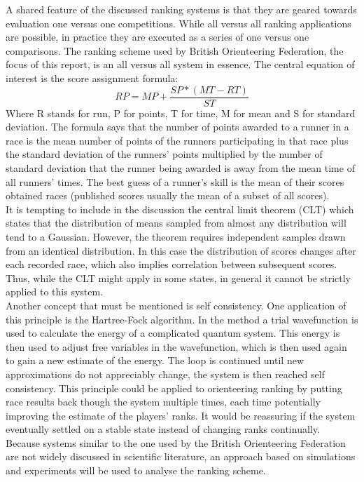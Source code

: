 A shared feature of the discussed ranking systems is that they are geared towards evaluation one versus one competitions. While all versus all ranking applications are possible, in practice they are executed as a series of one versus one comparisons. The ranking scheme used by British Orienteering Federation, the focus of this report, is an all versus all system in essence. The central equation of interest is the score assignment formula\cite{bof}:
\begin{equation}
RP = MP + \frac{SP * (MT - RT)}{ST}
\end{equation}
Where R stands for run, P for points, T for time, M for mean and S for standard deviation. The formula says that the number of points awarded to a runner in a race is the mean number of points of the runners participating in that race plus the standard deviation of the runners' points multiplied by the number of standard deviation that the runner being awarded is away from the mean time of all runners' times. The best guess of a runner's skill is the mean of their scores obtained races (published scores usually the mean of a subset of all scores).\\
It is tempting to include in the discussion the central limit theorem (CLT) which states that the distribution of means sampled from almost any distribution will tend to a Gaussian\cite{probability}. However, the theorem requires independent samples drawn from an identical distribution. In this case the distribution of scores changes after each recorded race, which also implies correlation between subsequent scores. Thus, while the CLT might apply in some states, in general it cannot be strictly applied to this system.\\
Another concept that must be mentioned is self consistency. One application of this principle is the Hartree-Fock algorithm. In the method a trial wavefunction is used to calculate the energy of a complicated quantum system. This energy is then used to adjust free variables in the wavefunction, which is then used again to gain a new estimate of the energy. The loop is continued until new approximations do not appreciably change, the system is then reached self consistency. This principle could be applied to orienteering ranking by putting race results back though the system multiple times, each time potentially improving the estimate of the players' ranks. It would be reassuring if the system eventually settled on a stable state instead of changing ranks continually.\\
Because systems similar to the one used by the British Orienteering Federation are not widely discussed in scientific literature, an approach based on simulations and experiments will be used to analyse the ranking scheme.


